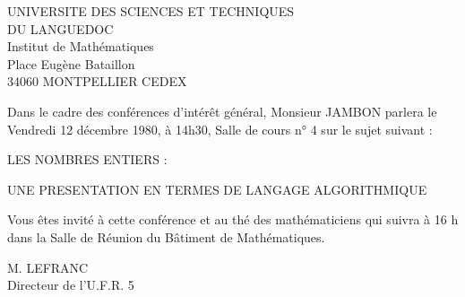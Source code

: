 UNIVERSITE DES SCIENCES ET TECHNIQUES\\
DU LANGUEDOC\\
Institut de Mathématiques\\
Place Eugène Bataillon\\
34060 MONTPELLIER CEDEX

Dans le cadre des conférences d'intérêt général, Monsieur JAMBON parlera le Vendredi 12 décembre 1980, à 14h30, Salle de cours n° 4 sur le sujet suivant :

LES NOMBRES ENTIERS :

UNE PRESENTATION EN TERMES DE LANGAGE ALGORITHMIQUE

Vous êtes invité à cette conférence et au thé des mathématiciens qui suivra à 16 h dans la Salle de Réunion du Bâtiment de Mathématiques.

M. LEFRANC\\
Directeur de l'U.F.R. 5

